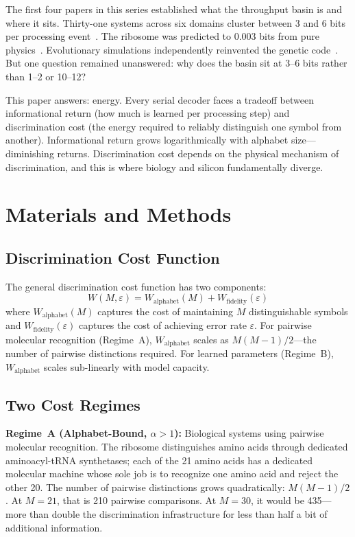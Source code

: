 \documentclass[11pt]{article}
\begin{document}
The first four papers in this series established what the throughput basin is and where it sits. Thirty-one systems across six domains cluster between 3 and 6 bits per processing event~\cite{whitmer2026floor,whitmer2026basin}. The ribosome was predicted to 0.003 bits from pure physics~\cite{whitmer2026serial}. Evolutionary simulations independently reinvented the genetic code~\cite{whitmer2026basin}. But one question remained unanswered: why does the basin sit at 3--6 bits rather than 1--2 or 10--12?

This paper answers: energy. Every serial decoder faces a tradeoff between informational return (how much is learned per processing step) and discrimination cost (the energy required to reliably distinguish one symbol from another). Informational return grows logarithmically with alphabet size---diminishing returns. Discrimination cost depends on the physical mechanism of discrimination, and this is where biology and silicon fundamentally diverge.

\section{Materials and Methods}

\subsection{Discrimination Cost Function}

The general discrimination cost function has two components:
\begin{equation}
W(M, \varepsilon) = W_{\mathrm{alphabet}}(M) + W_{\mathrm{fidelity}}(\varepsilon)
\end{equation}
where $W_{\mathrm{alphabet}}(M)$ captures the cost of maintaining $M$ distinguishable symbols and $W_{\mathrm{fidelity}}(\varepsilon)$ captures the cost of achieving error rate $\varepsilon$. For pairwise molecular recognition (Regime~A), $W_{\mathrm{alphabet}}$ scales as $M(M-1)/2$---the number of pairwise distinctions required. For learned parameters (Regime~B), $W_{\mathrm{alphabet}}$ scales sub-linearly with model capacity.

\subsection{Two Cost Regimes}

\textbf{Regime~A (Alphabet-Bound, $\alpha > 1$):} Biological systems using pairwise molecular recognition. The ribosome distinguishes amino acids through dedicated aminoacyl-tRNA synthetases; each of the 21 amino acids has a dedicated molecular machine whose sole job is to recognize one amino acid and reject the other 20. The number of pairwise distinctions grows quadratically: $M(M-1)/2$. At $M = 21$, that is 210 pairwise comparisons. At $M = 30$, it would be 435---more than double the discrimination infrastructure for less than half a bit of additional information.
\end{document}
